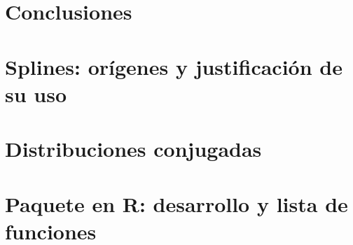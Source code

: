 \documentclass[pdftex,11pt, oneside]{book}
\theoremstyle{plain}
\theoremstyle{definition}
\begin{document}
\chapter{Conclusiones} \label{cap:Conclusiones}



\appendix
\chapter{Splines: orígenes y justificación de su uso} 
\label{ap:Splines}


\chapter{Distribuciones conjugadas} 
\label{ap:DistrosConjugadas}


\chapter{Paquete en R: desarrollo y lista de funciones} \label{ap:Paquete}


%

\backmatter
{}
\printbibliography
\end{document}
